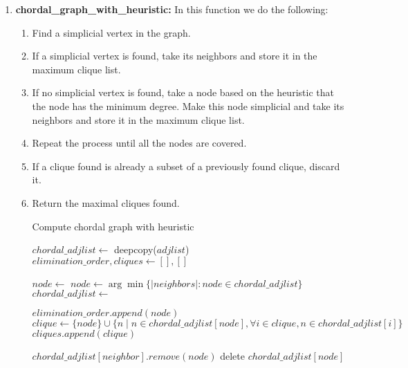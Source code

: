 \documentclass[12pt]{article}
\begin{document}
\begin{enumerate}
    \item \textbf{chordal\_graph\_with\_heuristic:} In this function we do the following:
        \begin{enumerate}
            \item Find a simplicial vertex in the graph.
            \item If a simplicial vertex is found, take its neighbors and store it in the maximum clique list.
            \item If no simplicial vertex is found, take a node based on the heuristic that the node has the minimum degree. Make this node simplicial and take its neighbors and store it in the maximum clique list.
            \item Repeat the process until all the nodes are covered.
            \item If a clique found is already a subset of a previously found clique, discard it.
            \item Return the maximal cliques found.
            
            \begin{algorithm}
                \caption{Compute chordal graph with heuristic}
                \begin{algorithmic}[1]
                    \State $chordal\_adjlist \gets$ deepcopy($adjlist$)
                    \State $elimination\_order, cliques \gets [], []$
                
                        \State $node \gets$ 
                            \State $node \gets \arg\min \{|neighbors| : node \in chordal\_adjlist\}$
                            \State $chordal\_adjlist \gets$ 
                        \EndIf
                        
                        \State $elimination\_order.append(node)$
                        \State $clique \gets \{node\} \cup \{n \mid n \in chordal\_adjlist[node], \forall i \in clique, n \in chordal\_adjlist[i]\}$
                        \State $cliques.append(clique)$
                        
                            \State $chordal\_adjlist[neighbor].remove(node)$
                        \EndFor
                        \State delete $chordal\_adjlist[node]$
                    \EndWhile
                
                    \State \Return {}
                \EndFunction
                \end{algorithmic}
            \end{algorithm}
        \end{enumerate}

\end{enumerate}
\end{document}
